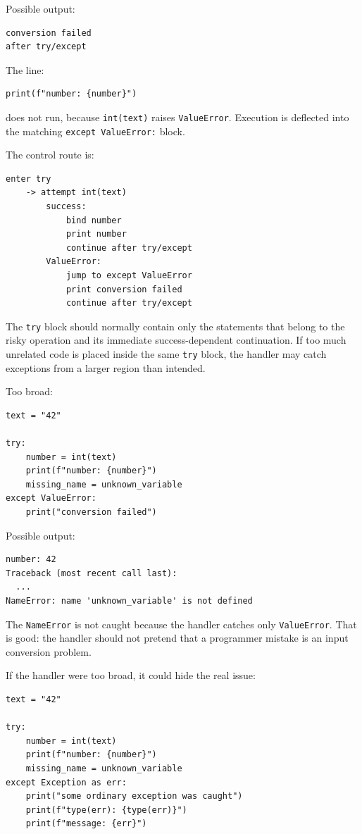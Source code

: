Possible output:

\begin{verbatim}
conversion failed
after try/except
\end{verbatim}

The line:

\begin{verbatim}
print(f"number: {number}")
\end{verbatim}

does not run, because \texttt{int(text)} raises \texttt{ValueError}. Execution is deflected into the matching \texttt{except ValueError:} block.

The control route is:

\begin{verbatim}
enter try
    -> attempt int(text)
        success:
            bind number
            print number
            continue after try/except
        ValueError:
            jump to except ValueError
            print conversion failed
            continue after try/except
\end{verbatim}

The \texttt{try} block should normally contain only the statements that belong to the risky operation and its immediate success-dependent continuation. If too much unrelated code is placed inside the same \texttt{try} block, the handler may catch exceptions from a larger region than intended.

Too broad:

\begin{verbatim}
text = "42"

try:
    number = int(text)
    print(f"number: {number}")
    missing_name = unknown_variable
except ValueError:
    print("conversion failed")
\end{verbatim}

Possible output:

\begin{verbatim}
number: 42
Traceback (most recent call last):
  ...
NameError: name 'unknown_variable' is not defined
\end{verbatim}

The \texttt{NameError} is not caught because the handler catches only \texttt{ValueError}. That is good: the handler should not pretend that a programmer mistake is an input conversion problem.

If the handler were too broad, it could hide the real issue:

\begin{verbatim}
text = "42"

try:
    number = int(text)
    print(f"number: {number}")
    missing_name = unknown_variable
except Exception as err:
    print("some ordinary exception was caught")
    print(f"type(err): {type(err)}")
    print(f"message: {err}")
\end{verbatim}

